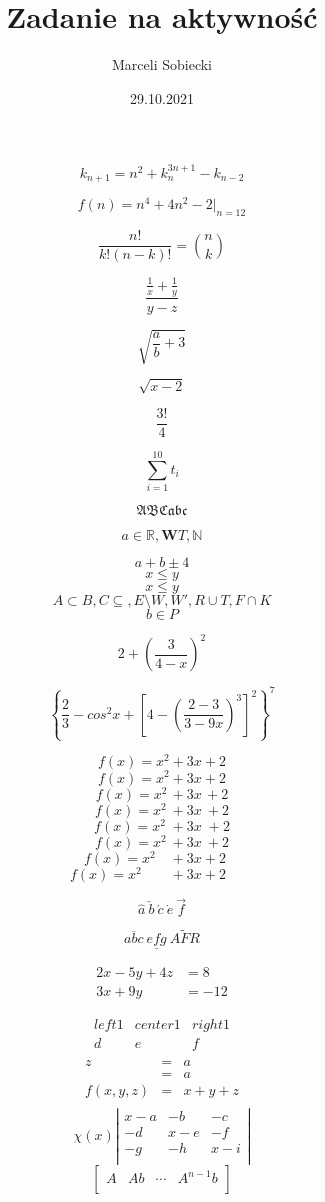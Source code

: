 \documentclass[12pt,legalpaper,notitlepage]{article}
\title{Zadanie na aktywność}
\author{Marceli Sobiecki}
\date{29.10.2021}
\begin{document}
\maketitle

$$k_{n+1}= n^2+k^{3n+1}_n-k_{n-2}$$

$$f(n)=n^4+4n^2-2|_{n=12}$$

$$\frac {n!} {k!(n-k)!}=\binom{n}{k}$$

$$\frac {\frac {1} {x}+ \frac {1}{y}} {y-z}$$

$$\sqrt {\frac {a} {b} + 3}$$

$$\sqrt {x-2}$$

$$\frac {3!} {4}$$

$$\sum_{i=1}^{10} t_i$$

$$\mathfrak{ABCabc}$$

$$ a\in \mathbb{R}, \mathbf{W} T,\mathbb{N} $$

$$a+b\pm 4$$
$$x\leq y$$
$$x \leqslant y$$
$$A\subset B, C \subseteq , E \setminus W, W', R \cup T, F \cap K$$
$$b \in P$$



$$2+\left(\frac{3}{4-x}\right)^2$$

$$\left\{\frac {2}{3}-cos^2x+\left[4-\left(\frac{2-3}{3-9x}\right)^3\right]^2\right\}^7$$

$$f(x) = x^2\! +3x\! +2 $$
$$f(x) = x^2 + 3x+2 $$
$$f(x) = x^2\, +3x\, +2 $$
$$f(x) = x^2\: + 3x\: +2 $$
$$f(x) = x^2\; + 3x\; +2 $$
$$f(x) = x^2\ +3x\ +2 $$
$$f(x) = x^2\quad + 3x+2\quad $$
$$f(x) = x^2\qquad + 3x+2\qquad $$

$$\hat{a} \ \check{b} \ \acute{c} \ \dot{e} \ \vec{f}$$

$$\overline{abc}\ \underline{efg}\ \widetilde{AFR}$$

\begin{align*}
2x -5y +4z &= 8\\
3x + 9y &= -12
\end{align*}

$$
\begin{array}{|l|cr}
left1 & center 1 & right1 \\ \hline
d	&	e	& f	\\
\end{array}
$$
$$
\begin{array}{lll}
z		&=& a		\\
		&=& a		\\
f(x,y,z) &=& x+y+z	\\
\end{array}
$$
$$\chi (x) \left|
\begin{array}{ccc}
x-a & -b & -c \\
-d & x-e & -f \\
-g & -h & x-i \\
\end{array} \right|
$$
$$
\left[
\begin{array}{c|c|c|c}
A & Ab & \cdots & A^{n-1} b \\
\end{array}
\right]
$$
\end{document}
